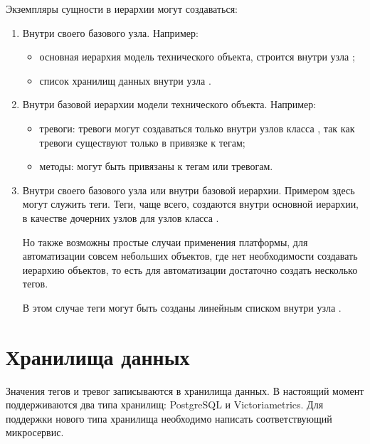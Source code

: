 \documentclass[a4paper,10pt,russian]{sphinxmanual}
\begin{document}
\sphinxAtStartPar
Экземпляры сущности в иерархии могут создаваться:
\begin{enumerate}
%
\item {}
\sphinxAtStartPar
Внутри своего базового узла. Например:
\begin{itemize}
\item {}
\sphinxAtStartPar
основная иерархия \sphinxhyphen{} модель технического объекта, строится внутри
узла ;

\item {}
\sphinxAtStartPar
список хранилищ данных \sphinxhyphen{} внутри узла .

\end{itemize}

\item {}
\sphinxAtStartPar
Внутри базовой иерархии \sphinxhyphen{} модели технического объекта. Например:
\begin{itemize}
\item {}
\sphinxAtStartPar
тревоги: тревоги могут создаваться только внутри узлов класса ,
так как тревоги существуют только в привязке к тегам;

\item {}
\sphinxAtStartPar
методы: могут быть привязаны к тегам или тревогам.

\end{itemize}

\item {}
\sphinxAtStartPar
Внутри своего базового узла или внутри базовой иерархии. Примером здесь
могут служить теги. Теги, чаще всего, создаются внутри основной иерархии,
в качестве дочерних узлов для узлов класса .

\sphinxAtStartPar
Но также возможны простые случаи применения платформы, для автоматизации
совсем небольших объектов, где нет необходимости создавать иерархию
объектов, то есть для автоматизации достаточно создать несколько тегов.

\sphinxAtStartPar
В этом случае теги могут быть созданы линейным списком внутри узла .

\end{enumerate}


\section{Хранилища данных}
\label{\detokenize{architecture:id16}}
\sphinxAtStartPar
Значения тегов и тревог записываются в хранилища данных. В настоящий момент
поддерживаются два типа хранилищ: PostgreSQL и Victoriametrics.
Для поддержки нового типа хранилища необходимо написать соответствующий
микросервис.
\end{document}

